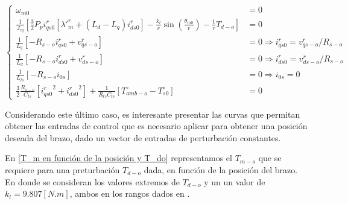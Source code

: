 \documentclass[a4paper, 10pt, onecolumn,journal]{ieeeconf}
\begin{document}
\begin{equation}
    \begin{cases}
        \omega_{m0} &= 0\\
        \frac{1}{J_{eq}}\left[\frac{3}{2} P_p i^r_{qs0}\left[\lambda'^r_m + (L_d - L_q) i^r_{ds0} \right] - \frac{k_l}{r}\sin\left(\frac{\theta_{m0}}{r}\right) - \frac{1}{r}T_{d-o}\right] &= 0\\
        \frac{1}{L_q}\left[-R_{s-o} i^r_{qs0} + v^r_{qs-o}\right] &= 0 \Rightarrow i^r_{qs0} = v^r_{qs-o}/R_{s-o}\\ 
        \frac{1}{L_d}\left[-R_{s-o} i^r_{ds0} + v^r_{ds-o}\right] &= 0 \Rightarrow i^r_{ds0} = v^r_{ds-o}/R_{s-o}\\ 
        \frac{1}{L_{ls}}\left[-R_{s-o} i_{0s}\right] &= 0 \Rightarrow i_{0s} = 0\\ 
        \frac{3}{2}\frac{R_{s-o}}{C_{ts}} \left[ {i^r_{qs0}}^2+ {i^r_{ds0}}^2 \right] + \frac{1}{R_{ts}C_{ts}}\left[T^{\circ}_{amb-o} - T_{s0}^{\circ}\right] &= 0
    \end{cases}
    \label{modelo de operacion NL cuasi_estacionario desarrollado reducido}
\end{equation}

Considerando este último caso, es interesante presentar las curvas que permitan obtener las entradas
de control que es necesario aplicar para obtener una posición deseada
del brazo, dado un vector de entradas de perturbación constantes.

En \cref{T_m en función de la posición y T_do} representamos
el $T_{m-o}$ que se requiere para una preturbación $T_{d-o}$ dada,
en función de la posición del brazo. En donde se
consideran los valores extremos de $T_{d-o}$ y un
un valor de $k_l = 9.807 \left[N.m\right]$, ambos en los rangos
dados en \cite{c1}.
\end{document}
